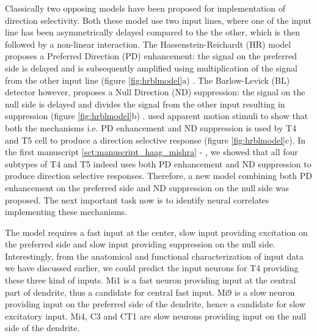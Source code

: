 Classically two opposing models have been proposed for implementation of direction selectivity. Both these model use two input lines, where one of the input line has been asymmetrically delayed compared to the the other, which is then followed by a non-linear interaction. The Hassenstein-Reichardt (HR) model proposes a Preferred Direction (PD) enhancement: the signal on the preferred side is delayed and is subsequently amplified using multiplication of the signal from the other input line (figure \ref{fig:hrblmodel}a) \parencite{Hassenstein1956}. The Barlow-Levick (BL) detector however, proposes a Null Direction (ND) suppression: the signal on the null side is delayed and divides the signal from the other input resulting in suppression (figure \ref{fig:hrblmodel}b) \parencite{Barlow1965}. \cite{Haag2016} used apparent motion stimuli to show that both the mechanisms i.e. PD enhancement and ND suppression is used by T4 and T5 cell to produce a direction selective response (figure \ref{fig:hrblmodel}c). In the first manuscript \ref{sct:manuscript_haag_mishra} - \parencite{Haag2017}, we showed that all four subtypes of T4 and T5 indeed uses both PD enhancement and ND suppression to produce direction selective responses. Therefore, a new model combining both PD enhancement on the preferred side and ND suppression on the null side was proposed. The next important task now is to identify neural correlates implementing these mechanisms. 

The model requires a fast input at the center, slow input providing excitation on the preferred side and slow input providing suppression on the null side. Interestingly, from the anatomical and functional characterization of input data we have discussed earlier, we could predict the input neurons for T4 providing these three kind of inputs. Mi1 is a fast neuron providing input at the central part of dendrite, thus a candidate for central fast input. Mi9 is a slow neuron providing input on the preferred side of the dendrite, hence a candidate for slow excitatory input. Mi4, C3 and CT1 are slow neurons providing input on the null side of the dendrite. 

